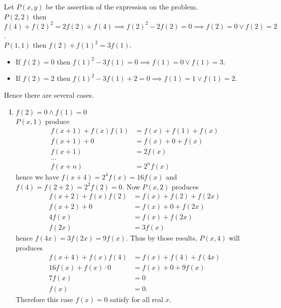 
\begin{solusi}
    Let $P(x,y)$ be the assertion of the expression on the problem.\\
    $P(2,2)$ then $f(4)+f(2)^2 = 2f(2)+f(4) \implies f(2)^2-2f(2)=0 \implies f(2)=0 \vee f(2)=2$.\\
    $P(1,1)$ then $f(2)+f(1)^2 = 3f(1)$.
    \begin{itemize}
        \item If $f(2)=0$ then $f(1)^2-3f(1)=0 \implies f(1)=0 \vee f(1)=3$.
        \item If $f(2)=2$ then $f(1)^2-3f(1)+2=0 \implies f(1)=1 \vee f(1)=2$.
    \end{itemize}
    Hence there are several cases.
    \begin{enumerate}[I.]
        \item $f(2)=0 \wedge f(1)=0$\\
        $P(x,1)$ produce
        \begin{align*}
            f(x+1)+f(x)f(1) &= f(x)+f(1)+f(x)\\
            f(x+1) + 0 &= f(x) + 0 + f(x)\\
            f(x+1) &= 2f(x)\\
            \dots\\
            f(x+n) &= 2^nf(x)
        \end{align*}
        hence we have $f(x+4) = 2^4f(x) = 16f(x)$ and $f(4)=f(2+2)=2^2f(2)=0$. Now
        $P(x,2)$ produces
        \begin{align*}
            f(x+2)+f(x)f(2) &= f(x)+f(2)+f(2x)\\
            f(x+2) + 0 &= f(x) + 0 + f(2x)\\
            4f(x) &= f(x)+f(2x)\\
            f(2x) &= 3f(x)
        \end{align*}
        hence $f(4x) = 3f(2x)=9f(x)$. Thus by those results, $P(x,4)$ will produces
        \begin{align*}
            f(x+4)+f(x)f(4) &= f(x)+f(4)+f(4x)\\
            16f(x) + f(x) \cdot 0 &= f(x) + 0 + 9f(x)\\
            7f(x) &= 0\\
            f(x) &= 0.
        \end{align*}
        Therefore this case $f(x)=0$ satisfy for all real $x$.
        

\end{enumerate}
\end{solusi}
